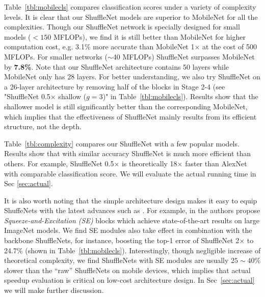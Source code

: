 \documentclass[10pt,twocolumn,letterpaper]{article}
\begin{document}
Table~\ref{tbl:mobilecls} compares classification scores under a variety of complexity levels. It is clear that our ShuffleNet models are superior to MobileNet for all the complexities. Though our ShuffleNet network is specially designed for small models ($<150$ MFLOPs), we find it is still better than MobileNet for higher computation cost, e.g. 3.1\% more accurate than MobileNet 1$\times$ at the cost of 500 MFLOPs. For smaller networks ($\sim$40 MFLOPs) ShuffleNet surpasses MobileNet by \textbf{7.8\%}. Note that our ShuffleNet architecture contains 50 layers while MobileNet only has 28 layers. For better understanding, we also try ShuffleNet on a 26-layer architecture by removing half of the blocks in Stage 2-4 (see "ShuffleNet 0.5$\times$ shallow ($g=3$)" in Table~\ref{tbl:mobilecls}). Results show that the shallower model is still significantly better than the corresponding MobileNet, which implies that the effectiveness of ShuffleNet mainly results from its efficient structure, not the depth.



Table~\ref{tbl:complexity} compares our ShuffleNet with a few popular models. Results show that with similar accuracy ShuffleNet is much more efficient than others. For example, ShuffleNet 0.5$\times$ is theoretically 18$\times$ faster than AlexNet~\cite{krizhevsky2012imagenet} with comparable classification score. We will evaluate the actual running time in Sec \ref{sec:actual}.

It is also worth noting that the simple architecture design makes it easy to equip ShuffeNets with the latest advances such as \cite{hu2017squeeze, ramachandran2017swish}. For example, in \cite{hu2017squeeze} the authors propose \emph{Squeeze-and-Excitation (SE)} blocks which achieve state-of-the-art results on large ImageNet models. We find SE modules also take effect in combination with the backbone ShuffleNets, for instance, boosting the top-1 error of ShuffleNet 2$\times$ to 24.7\% (shown in Table~\ref{tbl:mobilecls}). Interestingly, though negligible increase of theoretical complexity, we find ShuffleNets with SE modules are usually $25 \sim 40\%$ slower than the ``raw'' ShuffleNets on mobile devices, which implies that actual speedup evaluation is critical on low-cost architecture design. In Sec~\ref{sec:actual} we will make further discussion.
\end{document}
